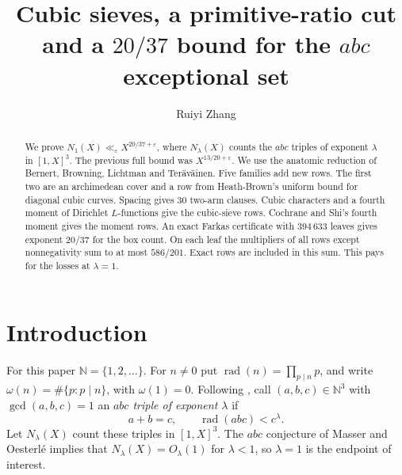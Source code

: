 \documentclass{amsart}
\theoremstyle{definition}
\theoremstyle{plain}
\numberwithin{equation}{section}
\numberwithin{table}{section}
\newcommand{\rad}{\operatorname{rad}}
\newcommand{\N}{\mathbb{N}}
\newcommand{\certLeaves}{394\,633}
\newcommand{\certLambda}{586/201}
\begin{document}
\title[The $20/37$ bound for the $abc$ exceptional set]{Cubic sieves, a primitive-ratio cut and a $20/37$ bound for the $abc$ exceptional set}
\author{Ruiyi Zhang}
\address{Independent Researcher, Columbia, Maryland, USA}

\begin{abstract}
We prove $N_1(X)\ll_\varepsilon X^{20/37+\varepsilon}$, where $N_\lambda(X)$
counts the $abc$ triples of exponent $\lambda$ in $[1,X]^3$. The previous full
bound was $X^{13/20+\varepsilon}$. We use the
anatomic reduction of Bernert, Browning, Lichtman and Ter\"av\"ainen. Five
families add new rows. The first two are an archimedean cover and a
row from Heath-Brown's uniform bound for diagonal cubic curves. Spacing gives $30$ two-arm clauses.
Cubic characters and a fourth moment of Dirichlet $L$-functions give the
cubic-sieve rows. Cochrane and Shi's fourth moment gives the moment rows.
An exact Farkas certificate with $\certLeaves$ leaves gives exponent $20/37$
for the box count. On each leaf the multipliers of all rows except
nonnegativity sum to at most $\certLambda$. Exact rows are included in this
sum. This pays for the losses at $\lambda=1$.
\end{abstract}

\maketitle

\section{Introduction}\label{sec:intro}

For this paper $\N=\{1,2,\ldots\}$. For $n\ne0$ put
$\rad(n)=\prod_{p\mid n}p$, and write $\omega(n)=\#\{p:p\mid n\}$,
with $\omega(1)=0$. Following \cite{BBLT}, call
$(a,b,c)\in\N^3$ with $\gcd(a,b,c)=1$ an \emph{$abc$ triple of exponent
$\lambda$} if
\begin{equation}\label{eq:triple}
 a+b=c,\qquad \rad(abc)<c^{\lambda}.
\end{equation}
Let $N_\lambda(X)$ count these triples in $[1,X]^3$. The $abc$ conjecture of
Masser and Oesterl\'e implies that $N_\lambda(X)=O_\lambda(1)$ for $\lambda<1$,
so $\lambda=1$ is the endpoint of interest.
\end{document}
